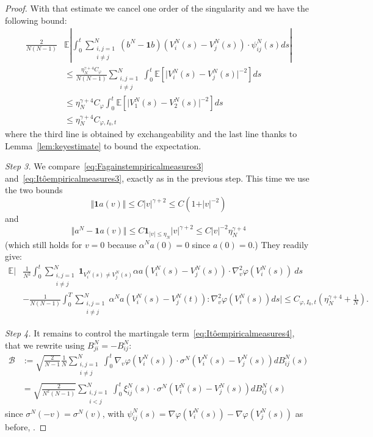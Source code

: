 \documentclass[10pt,a4paper]{amsart}
\begin{document}
\begin{proof}
    With that estimate we cancel one order of the singularity and we have the following bound:
    \begin{align*}
        \frac{2}{N(N-1)} &\mathbb{E}\left\vert \int_0^t \sum_{\substack{i,j=1\\ i\neq j}}^N  (b^N-\mathbf{1}b)\left(V^N_i(s) -V^N_j(s)\right)  \cdot \psi^N_{ij}(s) ds\right\vert \\
        &\leq \frac{\eta_N^{\gamma+4}C_\varphi}{N(N-1)} \sum_{\substack{i,j=1\\ i\neq j}}^N\int_0^t \mathbb{E} \left[\vert V^N_i(s) -V^N_j(s)\vert^{-2}\right]   ds\\
        &\leq \eta_N^{\gamma+4}C_\varphi \int_0^t \mathbb{E} \left[\vert V^N_1(s) -V^N_2(s)\vert^{-2}\right]   ds\\
        &\leq  \eta_N^{\gamma+4} C_{\varphi,I_0,t}
    \end{align*}
    where the third line is obtained by exchangeability and the last line thanks to Lemma~\ref{lem:keyestimate} to bound the expectation.

    \textit{Step 3.}
    We compare~\eqref{eq:Fagainstempiricalmeasures3} and~\eqref{eq:Itôempiricalmeasures3}, exactly as in the previous step.
    This time we use the two bounds
    $$\Vert\mathbf{1}a(v)\Vert \leq C \vert v \vert^{\gamma+2} \leq C(1 + \vert v \vert^{-2})$$ 
    and
    $$\Vert a^N - \mathbf{1}a(v)\Vert \leq C \mathbf{1}_{\vert v \vert \leq \eta_N}\vert v \vert^{\gamma + 2}  \leq C \vert v \vert^{-2} \eta_N^{\gamma+4}$$
    (which still holds for $v=0$ because $\alpha^N a(0)=0$ since $a(0)=0$.)
    They readily give:
    \begin{align*}
    \mathbb{E}\Bigg\vert &\frac{1}{N^2} \int_0^t \sum_{\substack{i,j=1\\ i\neq j}}^N \mathbf{1}_{V^N_i(s)\neq V^N_j(s)}\alpha a(V^N_i(s)-V^N_j(s)) \cdot \nabla^2_v\varphi(V^N_i(s))\ ds\\
    &- \frac{1}{N(N-1)} \int_0^T \sum_{\substack{i,j=1\\ i\neq j}}^N  \alpha^Na\left(V^N_i(s) -V^N_j(t)\right):\nabla^2_v\varphi\left(V^N_i(s)\right)ds \Bigg\vert\leq C_{\varphi,I_0,t}\left(\eta_N^{\gamma+4}+\frac{1}{N}\right) .
    \end{align*}

    \textit{Step 4.} It remains to control the martingale term~\eqref{eq:Itôempiricalmeasures4}, that we rewrite using $B^N_{ji}=-B^N_{ij}$:
    \begin{align*}
        \mathcal{B} &:= \sqrt{\frac{2}{N-1}}\frac{1}{N}\sum_{\substack{i,j=1\\ i\neq j}}^N \int_0^t  \nabla_v \varphi\left(V^N_i(s)\right)\cdot \sigma^N \left(V^N_i(s) - V^N_j(s)\right)dB^N_{ij}(s)\\
    &= \sqrt{\frac{2}{N^2(N-1)}}\sum_{\substack{i,j=1\\ i< j}}^N \int_0^t  \xi^N_{ij}(s)\cdot \sigma^N \left(V^N_i(s) - V^N_j(s)\right)dB^N_{ij}(s)
    \end{align*}
    since $\sigma^N(-v)=\sigma^N(v)$, with $\psi^N_{ij}(s) = \nabla\varphi(V^N_i(s))-\nabla \varphi(V^N_j(s))$ as before, .
    

\end{proof}
\end{document}
